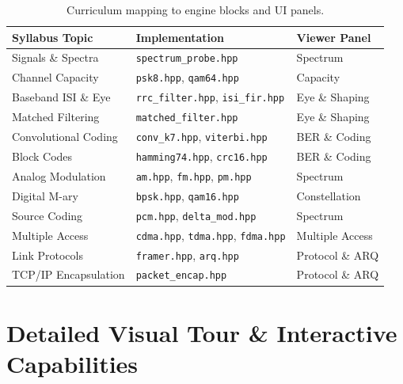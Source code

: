 \documentclass[10pt,twocolumn]{article}
\begin{document}
\begin{table}[htbp]
\centering
\footnotesize
\begin{tabular}{@{}lll@{}}
\toprule
\textbf{Syllabus Topic} & \textbf{Implementation} & \textbf{Viewer Panel} \\
\midrule
Signals \& Spectra & \texttt{spectrum\_probe.hpp} & Spectrum \\
Channel Capacity & \texttt{psk8.hpp}, \texttt{qam64.hpp} & Capacity \\
Baseband ISI \& Eye & \texttt{rrc\_filter.hpp}, \texttt{isi\_fir.hpp} & Eye \& Shaping \\
Matched Filtering & \texttt{matched\_filter.hpp} & Eye \& Shaping \\
Convolutional Coding & \texttt{conv\_k7.hpp}, \texttt{viterbi.hpp} & BER \& Coding \\
Block Codes & \texttt{hamming74.hpp}, \texttt{crc16.hpp} & BER \& Coding \\
Analog Modulation & \texttt{am.hpp}, \texttt{fm.hpp}, \texttt{pm.hpp} & Spectrum \\
Digital M-ary & \texttt{bpsk.hpp}, \texttt{qam16.hpp} & Constellation \\
Source Coding & \texttt{pcm.hpp}, \texttt{delta\_mod.hpp} & Spectrum \\
Multiple Access & \texttt{cdma.hpp}, \texttt{tdma.hpp}, \texttt{fdma.hpp} & Multiple Access \\
Link Protocols & \texttt{framer.hpp}, \texttt{arq.hpp} & Protocol \& ARQ \\
TCP/IP Encapsulation & \texttt{packet\_encap.hpp} & Protocol \& ARQ \\
\bottomrule
\end{tabular}
\caption{Curriculum mapping to engine blocks and UI panels.}
\label{tab:syllabus}
\end{table}

\section{Detailed Visual Tour \& Interactive Capabilities}
\end{document}
